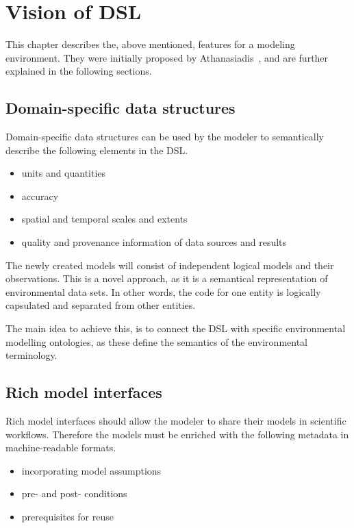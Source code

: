 \chapter{Vision of DSL}

This chapter describes the, above mentioned, features for a modeling environment. They were initially proposed by Athanasiadis~\autocite{dsl:ioannis}, and are further explained in the following sections.

\section{Domain-specific data structures}

Domain-specific data structures can be used by the modeler to semantically describe the following elements in the DSL.

\begin{itemize}
	\item units and quantities
	\item accuracy
	\item spatial and temporal scales and extents
	\item quality and provenance information of data sources and results
\end{itemize}

The newly created models will consist of independent logical models and their observations. This is a novel approach, as it is a semantical representation of environmental data sets. In other words, the code for one entity is logically capsulated and separated from other entities.

The main idea to achieve this, is to connect the DSL with specific environmental modelling ontologies, as these define the semantics of the environmental terminology.

\section{Rich model interfaces}

Rich model interfaces should allow the modeler to share their models in scientific workflows. Therefore the models must be enriched with the following metadata in machine-readable formats.

\begin{itemize}
	\item incorporating model assumptions
	\item pre- and post- conditions
	\item prerequisites for reuse
\end{itemize}

